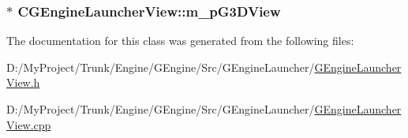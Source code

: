\subsubsection[{m\+\_\+p\+G3\+D\+View}]{$\ast$ C\+G\+Engine\+Launcher\+View\+::m\+\_\+p\+G3\+D\+View\hspace{0.3cm}{\ttfamily [protected]}}\label{class_c_g_engine_launcher_view_a330085fb305e652da374d8696f065f1e}


The documentation for this class was generated from the following files\+:\begin{DoxyCompactItemize}
\item 
D\+:/\+My\+Project/\+Trunk/\+Engine/\+G\+Engine/\+Src/\+G\+Engine\+Launcher/\hyperlink{_g_engine_launcher_view_8h}{G\+Engine\+Launcher\+View.\+h}\item 
D\+:/\+My\+Project/\+Trunk/\+Engine/\+G\+Engine/\+Src/\+G\+Engine\+Launcher/\hyperlink{_g_engine_launcher_view_8cpp}{G\+Engine\+Launcher\+View.\+cpp}\end{DoxyCompactItemize}
